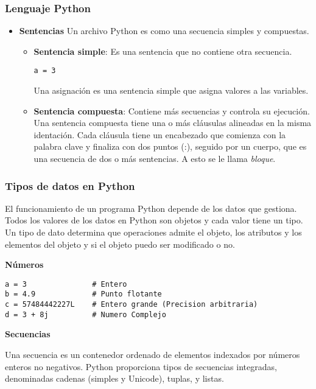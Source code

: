 \documentclass[10pt]{beamer}
\begin{document}
\begin{frame}[fragile]
\frametitle{Lenguaje Python}
\begin{itemize}
\item \textbf{Sentencias} Un archivo Python es como una secuencia simples y compuestas.



\begin{itemize}
\item \textbf{Sentencia simple}: Es una sentencia que no contiene otra secuencia. 
\begin{lstlisting}
a = 3
\end{lstlisting}

Una asignaci\'on es una sentencia simple que asigna valores a las variables.

\item \textbf{Sentencia compuesta}: Contiene m\'as secuencias y controla su ejecuci\'on.  Una sentencia compuesta tiene una o m\'as cl\'ausulas alineadas en la misma identaci\'on. Cada cl\'ausula tiene un encabezado que comienza con la palabra clave y finaliza con dos puntos (:), seguido por un cuerpo, que es una secuencia de dos o m\'as sentencias. A esto se le llama \textit{bloque}.  
\end{itemize}
\end{itemize}
\end{frame}


\begin{frame}[fragile]
\frametitle{Tipos de datos en Python}

El funcionamiento de un programa Python depende de los datos que gestiona. Todos los valores de los datos en Python son objetos y cada valor tiene un tipo. Un tipo de dato determina que operaciones admite el objeto, los atributos y los elementos del objeto y si el objeto puedo ser modificado o no. 	


\vspace{0.3cm}


\textbf{N\'umeros}
\begin{lstlisting}
a = 3               # Entero
b = 4.9             # Punto flotante
c = 57484442227L    # Entero grande (Precision arbitraria)
d = 3 + 8j          # Numero Complejo
\end{lstlisting}

\vspace{0.3cm}

\textbf{Secuencias} 

\vspace{0.2cm}

Una secuencia es un contenedor ordenado de elementos indexados por n\'umeros enteros no negativos. Python proporciona tipos de secuencias integradas, denominadas cadenas (simples y Unicode), tuplas, y listas.
\end{frame}
\end{document}

